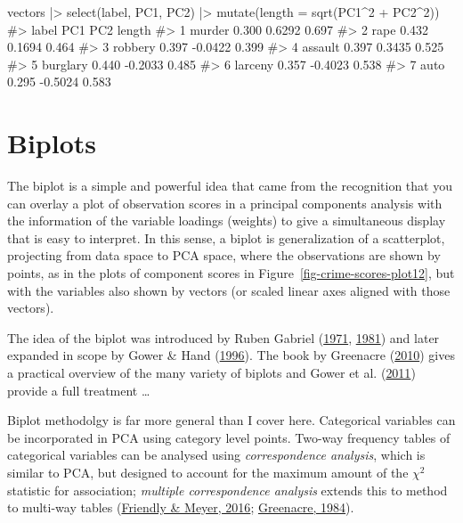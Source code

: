\documentclass[
  letterpaper,
  10pt,
  krantz2]{krantz}
\makeatletter
\newenvironment{Shaded}{\begin{snugshade}}{\end{snugshade}}
\newcommand{\AttributeTok}[1]{\textcolor[rgb]{0.40,0.45,0.13}{#1}}
\newcommand{\CommentTok}[1]{\textcolor[rgb]{0.37,0.37,0.37}{#1}}
\newcommand{\DecValTok}[1]{\textcolor[rgb]{0.68,0.00,0.00}{#1}}
\newcommand{\FunctionTok}[1]{\textcolor[rgb]{0.28,0.35,0.67}{#1}}
\newcommand{\NormalTok}[1]{\textcolor[rgb]{0.00,0.23,0.31}{#1}}
\newcommand{\SpecialCharTok}[1]{\textcolor[rgb]{0.37,0.37,0.37}{#1}}
\newenvironment{kframe}{%
  \medskip{}
  \setlength{\fboxsep}{.8em}
  \def\at@end@of@kframe{}%
  \ifinner\ifhmode%
  \def\at@end@of@kframe{\end{minipage}}%
  \begin{minipage}{\columnwidth}%
  \fi\fi%
  \def\FrameCommand##1{\hskip\@totalleftmargin \hskip-\fboxsep
  \colorbox{shadecolor}{##1}\hskip-\fboxsep
      \hskip-\linewidth \hskip-\@totalleftmargin \hskip\columnwidth}%
  \MakeFramed {\advance\hsize-\width
    \@totalleftmargin\z@ \linewidth\hsize
    \@setminipage}}%
{\par\unskip\endMakeFramed%
  \at@end@of@kframe}
\renewenvironment{Shaded}{\begin{kframe}}{\end{kframe}}
\makeatother
\begin{document}
\begin{Shaded}
\begin{Highlighting}[]
\NormalTok{vectors }\SpecialCharTok{|\textgreater{}} \FunctionTok{select}\NormalTok{(label, PC1, PC2) }\SpecialCharTok{|\textgreater{}} 
  \FunctionTok{mutate}\NormalTok{(}\AttributeTok{length =} \FunctionTok{sqrt}\NormalTok{(PC1}\SpecialCharTok{\^{}}\DecValTok{2} \SpecialCharTok{+}\NormalTok{ PC2}\SpecialCharTok{\^{}}\DecValTok{2}\NormalTok{))}
\CommentTok{\#\textgreater{}      label   PC1     PC2 length}
\CommentTok{\#\textgreater{} 1   murder 0.300  0.6292  0.697}
\CommentTok{\#\textgreater{} 2     rape 0.432  0.1694  0.464}
\CommentTok{\#\textgreater{} 3  robbery 0.397 {-}0.0422  0.399}
\CommentTok{\#\textgreater{} 4  assault 0.397  0.3435  0.525}
\CommentTok{\#\textgreater{} 5 burglary 0.440 {-}0.2033  0.485}
\CommentTok{\#\textgreater{} 6  larceny 0.357 {-}0.4023  0.538}
\CommentTok{\#\textgreater{} 7     auto 0.295 {-}0.5024  0.583}
\end{Highlighting}
\end{Shaded}

\hypertarget{sec-biplot}{%
\section{Biplots}\label{sec-biplot}}

The biplot is a simple and powerful idea that came from the recognition
that you can overlay a plot of observation scores in a principal
components analysis with the information of the variable loadings
(weights) to give a simultaneous display that is easy to interpret. In
this sense, a biplot is generalization of a scatterplot, projecting from
data space to PCA space, where the observations are shown by points, as
in the plots of component scores in
Figure~\ref{fig-crime-scores-plot12}, but with the variables also shown
by vectors (or scaled linear axes aligned with those vectors).

The idea of the biplot was introduced by Ruben Gabriel
(\protect\hyperlink{ref-Gabriel:71}{1971},
\protect\hyperlink{ref-Gabriel:81}{1981}) and later expanded in scope by
Gower \& Hand (\protect\hyperlink{ref-GowerHand:96}{1996}). The book by
Greenacre (\protect\hyperlink{ref-Greenacre:2010:biplots}{2010}) gives a
practical overview of the many variety of biplots and Gower et al.
(\protect\hyperlink{ref-Gower-etal:2011}{2011}) provide a full treatment
\ldots{}

Biplot methodolgy is far more general than I cover here. Categorical
variables can be incorporated in PCA using category level points.
Two-way frequency tables of categorical variables can be analysed using
\emph{correspondence analysis}, which is similar to PCA, but designed to
account for the maximum amount of the \(\chi^2\) statistic for
association; \emph{multiple correspondence analysis} extends this to
method to multi-way tables
(\protect\hyperlink{ref-FriendlyMeyer:2016:DDAR}{Friendly \& Meyer,
2016}; \protect\hyperlink{ref-Greenacre:84}{Greenacre, 1984}).
\end{document}

